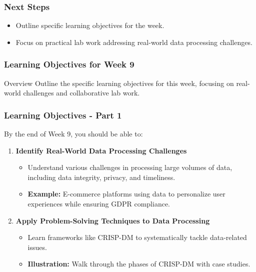 \documentclass[aspectratio=169]{beamer}
\begin{document}
\begin{frame}[fragile]
    \frametitle{Next Steps}
    \begin{itemize}
        \item Outline specific learning objectives for the week.
        \item Focus on practical lab work addressing real-world data processing challenges.
    \end{itemize}
\end{frame}

\begin{frame}[fragile]
    \frametitle{Learning Objectives for Week 9}
    \begin{block}{Overview}
        Outline the specific learning objectives for this week, focusing on real-world challenges and collaborative lab work.
    \end{block}
\end{frame}

\begin{frame}[fragile]
    \frametitle{Learning Objectives - Part 1}
    By the end of Week 9, you should be able to:
    \begin{enumerate}
        \item \textbf{Identify Real-World Data Processing Challenges}
        \begin{itemize}
            \item Understand various challenges in processing large volumes of data, including data integrity, privacy, and timeliness.
            \item \textbf{Example:} E-commerce platforms using data to personalize user experiences while ensuring GDPR compliance.
        \end{itemize}
        
        \item \textbf{Apply Problem-Solving Techniques to Data Processing}
        \begin{itemize}
            \item Learn frameworks like CRISP-DM to systematically tackle data-related issues.
            \item \textbf{Illustration:} Walk through the phases of CRISP-DM with case studies.
        \end{itemize}
    \end{enumerate}
\end{frame}
\end{document}
